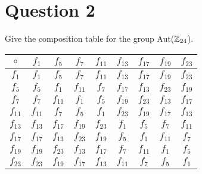 \documentclass[12pt]{article}
\begin{document}
    \section*{Question 2}
    Give the composition table for the group Aut(\(\mathbb{Z}_{24}\)).
    \begin{table}[H]
        \centering
        \begin{tabular}{c|cccccccc}
            \(\circ\) & \(f_1\) & \(f_5\) & \(f_7\) & \(f_{11}\) & \(f_{13}\) & \(f_{17}\) & \(f_{19}\) & \(f_{23}\)\\
            \hline
            \(f_{1}\) & \(f_{1}\) & \(f_{5}\) & \(f_{7}\) & \(f_{11}\) & \(f_{13}\) & \(f_{17}\) & \(f_{19}\) & \(f_{23}\) \\
            \(f_{5}\) & \(f_{5}\) & \(f_{1}\) & \(f_{11}\) & \(f_{7}\) & \(f_{17}\) & \(f_{13}\) & \(f_{23}\) & \(f_{19}\) \\
            \(f_{7}\) & \(f_{7}\) & \(f_{11}\) & \(f_{1}\) & \(f_{5}\) & \(f_{19}\) & \(f_{23}\) & \(f_{13}\) & \(f_{17}\) \\
            \(f_{11}\) & \(f_{11}\) & \(f_{7}\) & \(f_{5}\) & \(f_{1}\) & \(f_{23}\) & \(f_{19}\) & \(f_{17}\) & \(f_{13}\) \\
            \(f_{13}\) & \(f_{13}\) & \(f_{17}\) & \(f_{19}\) & \(f_{23}\) & \(f_{1}\) & \(f_{5}\) & \(f_{7}\) & \(f_{11}\) \\
            \(f_{17}\) & \(f_{17}\) & \(f_{13}\) & \(f_{23}\) & \(f_{19}\) & \(f_{5}\) & \(f_{1}\) & \(f_{11}\) & \(f_{7}\) \\
            \(f_{19}\) & \(f_{19}\) & \(f_{23}\) & \(f_{13}\) & \(f_{17}\) & \(f_{7}\) & \(f_{11}\) & \(f_{1}\) & \(f_{5}\) \\
            \(f_{23}\) & \(f_{23}\) & \(f_{19}\) & \(f_{17}\) & \(f_{13}\) & \(f_{11}\) & \(f_{7}\) & \(f_{5}\) & \(f_{1}\) \\
        \end{tabular}
    \end{table}
\end{document}

